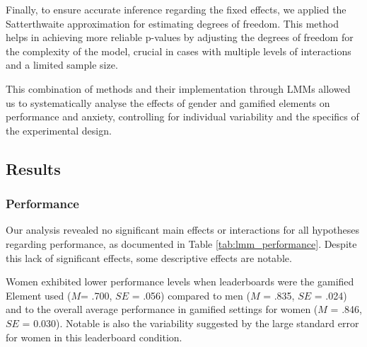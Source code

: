 Finally, to ensure accurate inference regarding the fixed effects, we applied the Satterthwaite approximation for estimating degrees of freedom.
This method helps in achieving more reliable p-values by adjusting the degrees of freedom for the complexity of the model, crucial in cases with multiple levels of interactions and a limited sample size.

This combination of methods and their implementation through LMMs allowed us to systematically analyse the effects of gender and gamified elements on performance and anxiety, controlling for individual variability and the specifics of the experimental design.

\subsection{Results}

\subsubsection{Performance}
Our analysis revealed no significant main effects or interactions for all hypotheses regarding performance, as documented in Table \ref{tab:lmm_performance}. Despite this lack of significant effects, some descriptive effects are notable.

Women exhibited lower performance levels when leaderboards were the gamified Element used ($M $= .700, $SE$ = .056) compared to men ($M$ = .835, $SE$ = .024) and to the overall average performance in gamified settings for women ($M$ = .846, $SE$ = 0.030). Notable is also the variability suggested by the large standard error for women in this leaderboard condition.

